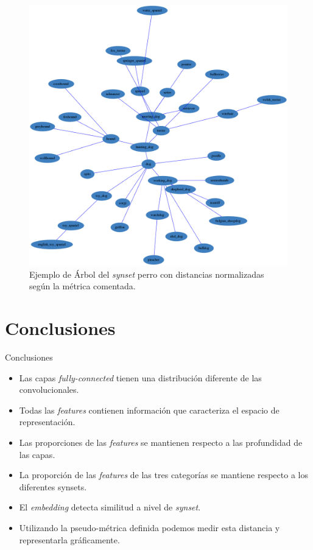 \documentclass{beamer}
\begin{document}
\begin{frame}
 \begin{figure}[H] 
	\centering
	\includegraphics[height=0.8\textheight] {Images/forest/dog.png}
	\caption{Ejemplo de Árbol del \textit{synset} perro con distancias normalizadas según la métrica comentada. 
	\label{fig:grafoperro}}
\end{figure}

\end{frame}

\section{Conclusiones}
\begin{frame}{Conclusiones}
\begin{itemize}
\item Las capas \textit{fully-connected} tienen una distribución diferente de las convolucionales.
\item Todas las \textit{features} contienen información que caracteriza el espacio de representación. 
\item Las proporciones de las \textit{features} se mantienen respecto a las profundidad de las capas.
\item La proporción de las \textit{features} de las tres categorías se mantiene respecto a los diferentes synsets. 
\item El \textit{embedding} detecta similitud a nivel de \textit{synset}. 
\item Utilizando la pseudo-métrica definida podemos medir esta distancia y representarla gráficamente. 
\end{itemize}
\end{frame}
\end{document}
